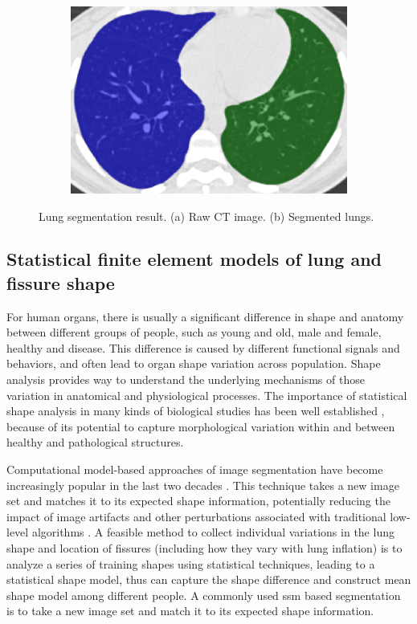 \begin{figure}[htbp]
\begin{subfigure}{.4\linewidth}
  \includegraphics[width=\linewidth,trim={{.0\wd0} {.0\wd0} {.0\wd0} {.0\wd0}},clip]{Segmentation/Image/LungSegmentationAfter.png}
  \caption{}
  \label{fig:LungSegmentation-b} 
\end{subfigure}
\caption{Lung segmentation result. (a) Raw CT image. (b) Segmented lungs.}
\label{fig:LungSegmentation}
\end{figure}

\subsection{Statistical finite element models of lung and fissure shape} \label{ShapeModelGeneration}
For human organs, there is usually a significant difference in shape and anatomy between different groups of people, such as young and old, male and female, healthy and disease. This difference is caused by different functional signals and behaviors, and often lead to organ shape variation across population. Shape analysis provides way to understand the underlying mechanisms of those variation in anatomical and physiological processes. The importance of statistical shape analysis in many kinds of biological studies has been well established \citep{dryden1998statistical,stegmann2002brief,styner2003statistical,heimann2009statistical,}, because of its potential to capture morphological variation within and between healthy and pathological structures.

Computational model-based approaches of image segmentation have become increasingly popular in the last two decades \citep{taylor1995medical,kelemen1999elastic,tsai2003shape,okada2008automated}. This technique takes a new image set and matches it to its expected shape information, potentially reducing the impact of image artifacts and other perturbations associated with traditional low-level algorithms \citep{ecabert2008automatic,zhang2013development}. A feasible method to collect individual variations in the lung shape and location of fissures (including how they vary with lung inflation) is to analyze a series of training shapes using statistical techniques, leading to a statistical shape model, thus can capture the shape difference and construct mean shape model among different people. A commonly used \gls{ssm} based segmentation is to take a new image set and match it to its expected shape information. 

